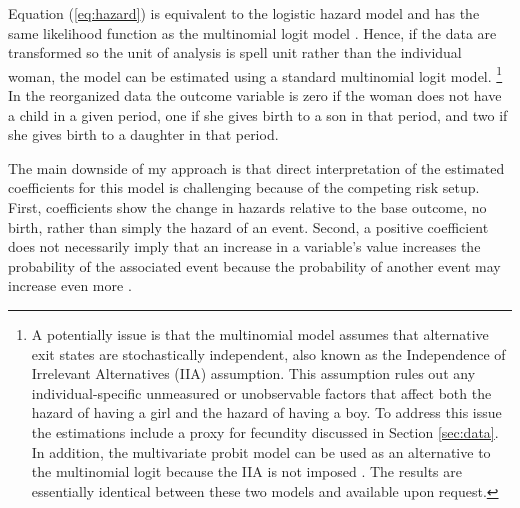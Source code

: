 \documentclass[12pt,letterpaper]{article}
\begin{document}
Equation (\ref{eq:hazard}) is equivalent to the logistic hazard model and has the same 
likelihood function as the multinomial logit model \citep{allison82,jenkins95}.
Hence, if the data are transformed so the unit of analysis is spell unit rather 
than the individual woman, the model can be estimated using a standard multinomial 
logit model.%
\footnote{
A potentially issue is that the multinomial model assumes that alternative 
exit states are stochastically independent,
also known as the Independence of Irrelevant Alternatives (IIA) assumption.
This assumption rules out any individual-specific unmeasured or 
unobservable factors that affect both the hazard of having a girl and the 
hazard of having a boy.
To address this issue the estimations include a proxy for fecundity
discussed in Section \ref{sec:data}.
In addition, the multivariate probit model can be used as an alternative
to the multinomial logit because the IIA is not imposed \citep{han90}.
The results are essentially identical between these two models and
available upon request.
}
In the reorganized data the outcome variable is zero if the
woman does not have a child in a given period, one if she gives birth to a son 
in that period, and two if she gives birth to a daughter in that period.

The main downside of my approach is that direct interpretation of the estimated 
coefficients for this model is challenging because of the competing risk setup.
First, coefficients show the change in hazards relative to the base outcome, 
no birth, rather than simply the hazard of an event.
Second, a positive coefficient does not necessarily imply that an increase in a
variable's value increases the probability of the associated event because the 
probability of another event may increase even more \citep{thomas96}.
\end{document}
